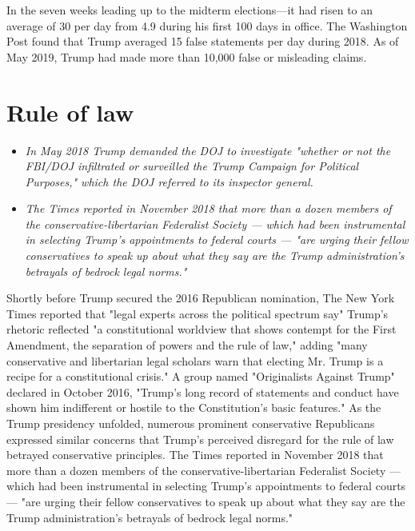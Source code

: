 In the seven weeks leading up to the midterm elections---it had risen to
an average of 30 per day from 4.9 during his first 100 days in office.
The Washington Post found that Trump averaged 15 false statements per
day during 2018. As of May 2019, Trump had made more than 10,000 false
or misleading claims.

\section{Rule of law}\label{rule-of-law}

\begin{itemize}
\item
  \emph{In May 2018 Trump demanded the DOJ to investigate "whether or
  not the FBI/DOJ infiltrated or surveilled the Trump Campaign for
  Political Purposes," which the DOJ referred to its inspector general.}
\item
  \emph{The Times reported in November 2018 that more than a dozen
  members of the conservative-libertarian Federalist Society --- which
  had been instrumental in selecting Trump's appointments to federal
  courts --- "are urging their fellow conservatives to speak up about
  what they say are the Trump administration's betrayals of bedrock
  legal norms."}
\end{itemize}

Shortly before Trump secured the 2016 Republican nomination, The New
York Times reported that "legal experts across the political spectrum
say" Trump's rhetoric reflected "a constitutional worldview that shows
contempt for the First Amendment, the separation of powers and the rule
of law," adding "many conservative and libertarian legal scholars warn
that electing Mr. Trump is a recipe for a constitutional crisis." A
group named "Originalists Against Trump" declared in October 2016,
"Trump's long record of statements and conduct have shown him
indifferent or hostile to the Constitution's basic features." As the
Trump presidency unfolded, numerous prominent conservative Republicans
expressed similar concerns that Trump's perceived disregard for the rule
of law betrayed conservative principles. The Times reported in November
2018 that more than a dozen members of the conservative-libertarian
Federalist Society --- which had been instrumental in selecting Trump's
appointments to federal courts --- "are urging their fellow
conservatives to speak up about what they say are the Trump
administration's betrayals of bedrock legal norms."

